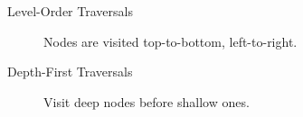 \begin{description}
\item[Level-Order Traversals] Nodes are visited top-to-bottom, left-to-right.
\item[Depth-First Traversals] Visit deep nodes before shallow ones.
\end{description}
